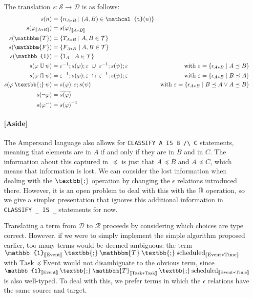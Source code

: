 \documentclass[12pt]{article}
\newcommand{\typesemi}{\mathbin{\text{\textbb{;}}}}
\newcommand{\typeunion}{\mathbin{\mathbb{U}}}
\newcommand{\typeinter}{\mathbin{\text{\rotatebox[origin=c]{180}{$\typeunion$}}}}
\newcommand{\typevee}{\mathbbm{T}}
\newcommand{\typenil}{\mathbbm{F}}
\newcommand{\typecomp}[1]{\neg{#1}}
\newcommand{\typeconv}[1]{{#1}^\smallsmile}
\newcommand{\typeident}{\mathbb{1}}
\newcommand{\typetyped}[2]{{#1}_{\llbracket #2 \rrbracket}}
\newcommand{\conv}[1]{{#1}^{-1}}
\begin{document}
The translation $s : \mathcal{S} \to \mathcal{D}$ is as follows:
\begin{align*}
s(n) &= \{n_{A*B} \mid (A,B)\in\mathcal{t}(n)\}\\
s(\typetyped{\varphi}{A*B}) &= \typetyped{s(\varphi)}{A*B}\\
s(\typevee) &= \{T_{A*B} \mid A,B\in\mathcal{T}\}\\
s(\typenil) &= \{F_{A*B} \mid A,B\in\mathcal{T}\}\\
s(\typeident) &= \{1_{A} \mid A\in\mathcal{T}\}\\
s(\varphi \typeunion \psi) &= \conv{\varepsilon};s(\varphi);\varepsilon\ \cup\ \conv{\varepsilon};s(\psi);\varepsilon&\quad\text{with $\varepsilon = \{\epsilon_{A*B} \mid A\preceq B \}$} \\
s(\varphi \typeinter \psi) &= \conv{\varepsilon};s(\varphi);\varepsilon\ \cap\ \conv{\varepsilon};s(\psi);\varepsilon&\quad\text{with $\varepsilon = \{\epsilon_{A*B} \mid B\preceq A \}$}\\
s(\varphi \typesemi \psi) &= s(\varphi);\varepsilon;s(\psi)&\text{with $\varepsilon = \{\epsilon_{A*B} \mid B\preceq A \vee A\preceq B \}$}\\
s(\typecomp{\varphi}) &= \overline{s(\varphi)}\\
s(\typeconv{\varphi}) &= \conv{s(\varphi)}
\end{align*}

\paragraph{[Aside]} The Ampersand language also allows for \verb=CLASSIFY A IS B /\ C= statements, meaning that elements are in $A$ if and only if they are in $B$ and in $C$.
The information about this captured in $\preceq$ is just that $A \preceq B$ and $A\preceq C$, which means that information is lost.
We can consider the lost information when dealing with the $\typesemi$ operation by changing the $\epsilon$ relations introduced there.
However, it is an open problem to deal with this with the $\typeinter$ operation, so we give a simpler presentation that ignores this additional information in \verb=CLASSIFY _ IS _= statements for now.

Translating a term from $\mathcal{D}$ to $\mathcal{R}$ proceeds by considering which choices are type correct.
However, if we were to simply implement the simple algorithm proposed earlier, too many terms would be deemed ambiguous:
the term $\typetyped{\typeident}{\mathrm{Event}} \typesemi \typevee \typesemi \typetyped{\mathrm{scheduled}}{\mathrm{Event}*\mathrm{Time}}$ with $\mathrm{Task}\preceq\mathrm{Event}$ would not disambiguate to the obvious term, since $\typetyped{\typeident}{\mathrm{Event}} \typesemi \typetyped{\typevee}{\mathrm{Task}*\mathrm{Task}} \typesemi \typetyped{\mathrm{scheduled}}{\mathrm{Event}*\mathrm{Time}}$ is also well-typed.
To deal with this, we prefer terms in which the $\epsilon$ relations have the same source and target.
\end{document}
